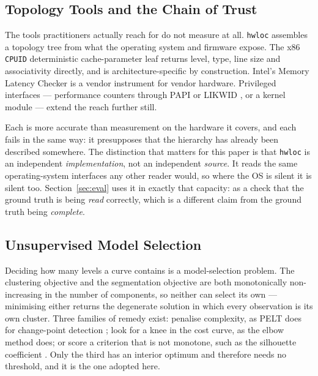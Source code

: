 \documentclass[conference]{IEEEtran}
\begin{document}
\subsection{Topology Tools and the Chain of Trust}

The tools practitioners actually reach for do not measure at all. \texttt{hwloc}
\citep{broquedis2010} assembles a topology tree from what the operating system and
firmware expose. The x86 \texttt{CPUID} deterministic cache-parameter leaf
\citep{intel2023} returns level, type, line size and associativity directly, and
is architecture-specific by construction. Intel's Memory Latency Checker
\citep{intel_mlc} is a vendor instrument for vendor hardware. Privileged
interfaces --- performance counters through PAPI \citep{terpstra2010} or
LIKWID \citep{treibig2010}, or a kernel module --- extend the reach further
still.

Each is more accurate than measurement on the hardware it covers, and each fails
in the same way: it presupposes that the hierarchy has already been described
somewhere. The distinction that matters for this paper is that \texttt{hwloc} is
an independent \emph{implementation}, not an independent \emph{source}. It reads
the same operating-system interfaces any other reader would, so where the OS is
silent it is silent too. Section~\ref{sec:eval} uses it in exactly that capacity:
as a check that the ground truth is being \emph{read} correctly, which is a
different claim from the ground truth being \emph{complete}.

\subsection{Unsupervised Model Selection}

Deciding how many levels a curve contains is a model-selection problem. The
clustering objective and the segmentation objective are both monotonically
non-increasing in the number of components, so neither can select its own
--- minimising either returns the degenerate solution in which every
observation is its own cluster. Three families of remedy exist: penalise
complexity, as PELT does for change-point detection \citep{killick2012}; look for
a knee in the cost curve, as the elbow method does; or score a criterion that is
not monotone, such as the silhouette coefficient \citep{rousseeuw1987}. Only the
third has an interior optimum and therefore needs no threshold, and it is the one
adopted here.
\end{document}
